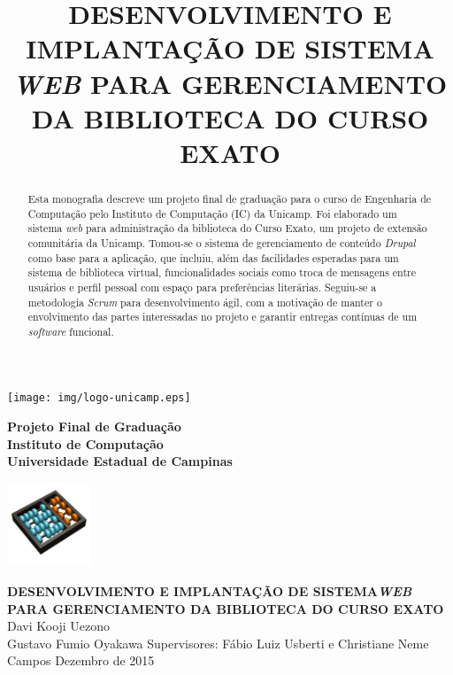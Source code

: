 \documentclass[a4paper]{article}
\title{DESENVOLVIMENTO E IMPLANTAÇÃO DE SISTEMA \textit{WEB} PARA GERENCIAMENTO DA BIBLIOTECA DO CURSO EXATO}
\begin{document}
\begin{minipage}[t|]{14mm}
\texttt{[image: img/logo-unicamp.eps]}
\end{minipage}
\hfill
\begin{minipage}[tl]{120mm}
\begin{center}
{\bf \sc Projeto Final de Graduação}\\
{\bf \sc Instituto de Computação} \\
{\bf \sc Universidade Estadual de Campinas} \\
\end{center}
\end{minipage}
\hfill
\begin{minipage}[c]{25mm}
\thispagestyle{empty}
\hspace{-0.5cm}
\includegraphics[width=25mm]{img/logo-ic.png}
\end{minipage}
\vfill\vfill
\begin{center}
\Huge{\textbf{DESENVOLVIMENTO E IMPLANTAÇÃO DE SISTEMA\textit{WEB} PARA GERENCIAMENTO DA BIBLIOTECA DO CURSO EXATO}}
\vfill\vfill
\huge{Davi Kooji Uezono\\Gustavo Fumio Oyakawa}
\vfill
\Large{Supervisores: Fábio Luiz Usberti e Christiane Neme Campos}
\vfill\vfill
\Large{Dezembro de 2015}
\end{center}
\vfill

\pagebreak
{}
\begin{abstract}
\normalsize
Esta monografia descreve um projeto final de graduação para o curso de Engenharia de Computação pelo Instituto de Computação (IC) da Unicamp. Foi elaborado um sistema \textit{web} para administração da biblioteca do Curso Exato, um projeto de extensão comunitária da Unicamp. Tomou-se o sistema de gerenciamento de conteúdo \textit{Drupal} como base para a aplicação, que incluiu, além das facilidades esperadas para um sistema de biblioteca virtual, funcionalidades sociais como troca de mensagens entre usuários e perfil pessoal com espaço para preferências literárias. Seguiu-se a metodologia \textit{Scrum} para desenvolvimento ágil, com a motivação de manter o envolvimento das partes interessadas no projeto e garantir entregas contínuas de um \textit{software} funcional.
\end{abstract}
\end{document}
